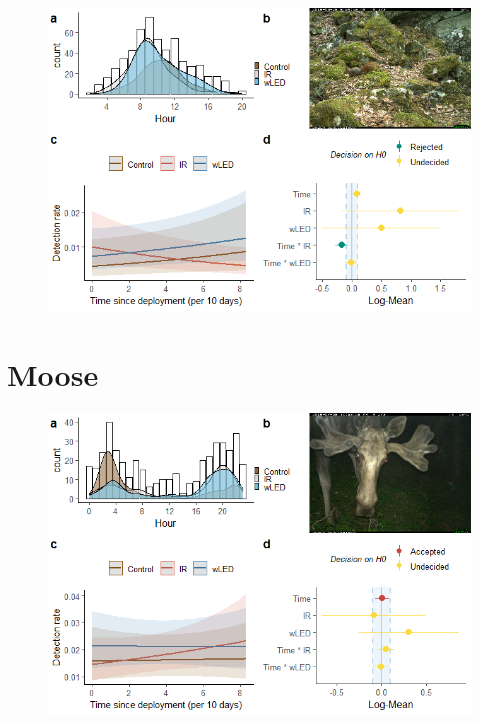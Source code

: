 \begin{table}[ht]
\begin{figure}
		  \centering
	\includegraphics[scale=.9]{../R/glmm_sp_files/figure-html/ekorn2-1.png}

\end{figure}







\newpage
\section{Moose}

\begin{figure}
		  \centering
	\includegraphics[scale=.9]{../R/glmm_sp_files/figure-html/elg2-1.png}

\end{figure}





\end{table}
